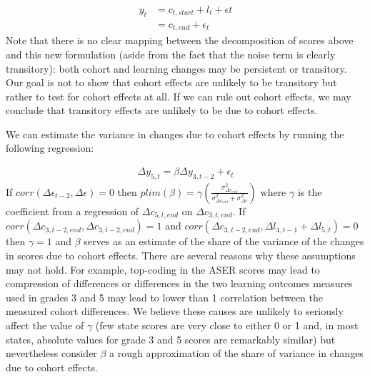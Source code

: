 \documentclass[
  11pt,
]{article}
\begin{document}
\[
\begin{aligned}
 y_{t} &= c_{t, start} + l_{t} + \epsilon{t} \\
 & = c_{t,end} + \epsilon_t
\end{aligned}
\]
Note that there is no clear mapping between the decomposition of scores above and this new formulation (aside from the fact that the noise term is clearly transitory): both cohort and learning changes may be persistent or transitory. Our goal is not to show that cohort effects are unlikely to be transitory but rather to test for cohort effects at all. If we can rule out cohort effects, we may conclude that transitory effects are unlikely to be due to cohort effects.

We can estimate the variance in changes due to cohort effects by running the following regression:

\[
\begin{aligned}
  \Delta y_{5,t} = \beta\Delta y_{3,t-2} + \epsilon_{t}
\end{aligned}
\]
If \(corr(\Delta \epsilon_{t-2},\Delta \epsilon) = 0\) then \(plim(\beta) = \gamma(\frac{\sigma^2_{\Delta c_{end}}}{\sigma^2_{\Delta c_{end}}+\sigma^2_{\Delta \epsilon}})\) where \(\gamma\) is the coefficient from a regression of \(\Delta c_{5,t,end}\) on \(\Delta c_{3,t,end}\). If \(corr(\Delta c_{3,t-2,end},\Delta c_{3,t-2,end}) = 1\) and \(corr(\Delta c_{3,t-2,end},\Delta l_{4,t-1}+ \Delta l_{5,t}) = 0\) then \(\gamma = 1\) and \(\beta\) serves as an estimate of the share of the variance of the changes in scores due to cohort effects. There are several reasons why these assumptions may not hold. For example, top-coding in the ASER scores may lead to compression of differences or differences in the two learning outcomes measures used in grades 3 and 5 may lead to lower than 1 correlation between the measured cohort differences. We believe these causes are unlikely to seriously affect the value of \(\gamma\) (few state scores are very close to either 0 or 1 and, in most states, absolute values for grade 3 and 5 scores are remarkably similar) but nevertheless consider \(\beta\) a rough approximation of the share of variance in changes due to cohort effects.
\end{document}
